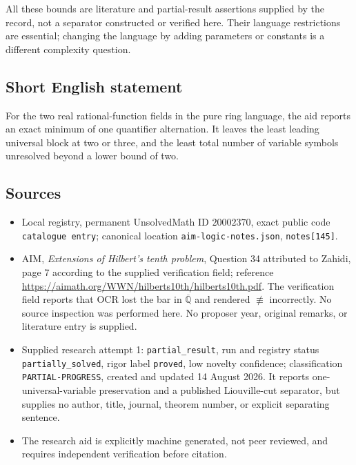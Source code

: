 \documentclass[11pt]{article}
\newcommand{\Q}{\mathbb{Q}}
\begin{document}
All these bounds are literature and partial-result assertions supplied by the record, not a separator constructed or verified here. Their language restrictions are essential; changing the language by adding parameters or constants is a different complexity question.
\subsection{Short English statement}
For the two real rational-function fields in the pure ring language, the aid reports an exact minimum of one quantifier alternation. It leaves the least leading universal block at two or three, and the least total number of variable symbols unresolved beyond a lower bound of two.
\subsection{Sources}
\begin{itemize}
\item Local registry, permanent UnsolvedMath ID \(20002370\), exact public code \texttt{catalogue entry}; canonical location \texttt{aim-logic-notes.json}, \texttt{notes[145]}.
\item AIM, \emph{Extensions of Hilbert's tenth problem}, Question 34 attributed to Zahidi, page 7 according to the supplied verification field; reference \url{https://aimath.org/WWN/hilberts10th/hilberts10th.pdf}. The verification field reports that OCR lost the bar in \(\overline{\Q}\) and rendered \(\not\equiv\) incorrectly. No source inspection was performed here. No proposer year, original remarks, or literature entry is supplied.
\item Supplied research attempt 1: \texttt{partial\_result}, run and registry status \texttt{partially\_solved}, rigor label \texttt{proved}, low novelty confidence; classification \texttt{PARTIAL-PROGRESS}, created and updated 14 August 2026. It reports one-universal-variable preservation and a published Liouville-cut separator, but supplies no author, title, journal, theorem number, or explicit separating sentence.
\item The research aid is explicitly machine generated, not peer reviewed, and requires independent verification before citation.
\end{itemize}
\end{document}
